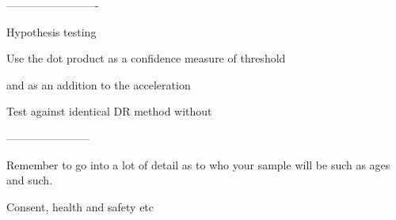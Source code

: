 \documentclass[journal]{IEEEtran}
\begin{document}
-------------------------

Hypothesis testing

Use the dot product as a confidence measure of threshold

and as an addition to the acceleration

Test against identical DR method without

-----------------------

Remember to go into a lot of detail as to who your sample will be such as ages and such.

Consent, health and safety etc







\end{document}
